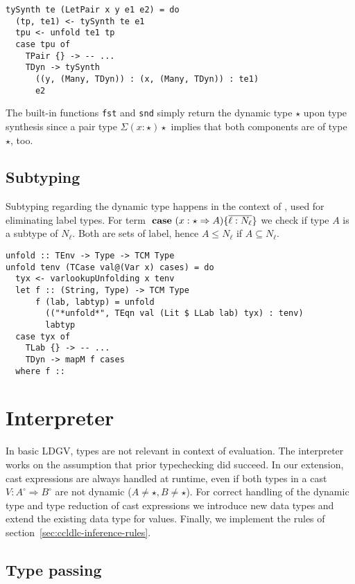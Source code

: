 \begin{lstlisting}[caption=TCTyping.hs]
tySynth te (LetPair x y e1 e2) = do
  (tp, te1) <- tySynth te e1
  tpu <- unfold te1 tp
  case tpu of
    TPair {} -> -- ...
    TDyn -> tySynth
      ((y, (Many, TDyn)) : (x, (Many, TDyn)) : te1)
      e2
\end{lstlisting}

The built-in functions \texttt{fst} and \texttt{snd} simply return the dynamic type $\star$ upon type synthesis since a pair type $\Sigma(x:\star)\star$ implies that both components are of type $\star$, too.

\subsection{Subtyping}

Subtyping regarding the dynamic type happens in the context of \case, used for eliminating label types. For term $\text{ \textbf{case} } (x:\star \Rightarrow A) \{ \overline{\ell : N_\ell} \}$ we check if type $A$ is a subtype of $N_\ell$. Both are sets of label, hence $A \leq N_\ell$ if $A \subseteq N_\ell$.

\begin{lstlisting}[caption=TCSubtyping.hs]
unfold :: TEnv -> Type -> TCM Type
unfold tenv (TCase val@(Var x) cases) = do
  tyx <- varlookupUnfolding x tenv
  let f :: (String, Type) -> TCM Type
      f (lab, labtyp) = unfold
        (("*unfold*", TEqn val (Lit $ LLab lab) tyx) : tenv)
        labtyp
  case tyx of
    TLab {} -> -- ...
    TDyn -> mapM f cases
  where f ::
\end{lstlisting}

\section{Interpreter}

In basic LDGV, types are not relevant in context of evaluation. The interpreter works on the assumption that prior typechecking did succeed. In our extension, cast expressions are always handled at runtime, even if both types in a cast $V : A^\circ \Rightarrow B^\circ$ are not dynamic ($A \neq \star, B \neq \star$).
For correct handling of the dynamic type and type reduction of cast expressions we introduce new data types and extend the existing data type for values. Finally, we implement the rules of section~\ref{sec:ccldlc-inference-rules}.


\subsection{Type passing}

